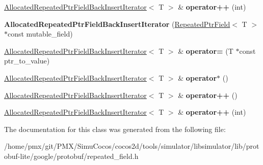 \begin{DoxyCompactItemize}
\hyperlink{classgoogle_1_1protobuf_1_1internal_1_1AllocatedRepeatedPtrFieldBackInsertIterator}{Allocated\+Repeated\+Ptr\+Field\+Back\+Insert\+Iterator}$<$ T $>$ \& {\bfseries operator++} (int)
\item 
\mbox{\label{classgoogle_1_1protobuf_1_1internal_1_1AllocatedRepeatedPtrFieldBackInsertIterator_a11470673c0ea0c8e9bcb431b05386671}} 
{\bfseries Allocated\+Repeated\+Ptr\+Field\+Back\+Insert\+Iterator} (\hyperlink{classgoogle_1_1protobuf_1_1RepeatedPtrField}{Repeated\+Ptr\+Field}$<$ T $>$ $\ast$const mutable\+\_\+field)
\item 
\mbox{\label{classgoogle_1_1protobuf_1_1internal_1_1AllocatedRepeatedPtrFieldBackInsertIterator_aaeecb23e156547bb981c0daeeac7f125}} 
\hyperlink{classgoogle_1_1protobuf_1_1internal_1_1AllocatedRepeatedPtrFieldBackInsertIterator}{Allocated\+Repeated\+Ptr\+Field\+Back\+Insert\+Iterator}$<$ T $>$ \& {\bfseries operator=} (T $\ast$const ptr\+\_\+to\+\_\+value)
\item 
\mbox{\label{classgoogle_1_1protobuf_1_1internal_1_1AllocatedRepeatedPtrFieldBackInsertIterator_a685a47e7dafd539725655a905087bed3}} 
\hyperlink{classgoogle_1_1protobuf_1_1internal_1_1AllocatedRepeatedPtrFieldBackInsertIterator}{Allocated\+Repeated\+Ptr\+Field\+Back\+Insert\+Iterator}$<$ T $>$ \& {\bfseries operator$\ast$} ()
\item 
\mbox{\label{classgoogle_1_1protobuf_1_1internal_1_1AllocatedRepeatedPtrFieldBackInsertIterator_aaf96b177bd6ed3b4f10818e1158e1906}} 
\hyperlink{classgoogle_1_1protobuf_1_1internal_1_1AllocatedRepeatedPtrFieldBackInsertIterator}{Allocated\+Repeated\+Ptr\+Field\+Back\+Insert\+Iterator}$<$ T $>$ \& {\bfseries operator++} ()
\item 
\mbox{\label{classgoogle_1_1protobuf_1_1internal_1_1AllocatedRepeatedPtrFieldBackInsertIterator_a6c513962487ea83e46bb1ca397b7359f}} 
\hyperlink{classgoogle_1_1protobuf_1_1internal_1_1AllocatedRepeatedPtrFieldBackInsertIterator}{Allocated\+Repeated\+Ptr\+Field\+Back\+Insert\+Iterator}$<$ T $>$ \& {\bfseries operator++} (int)
\end{DoxyCompactItemize}


The documentation for this class was generated from the following file\+:\begin{DoxyCompactItemize}
\item 
/home/pmx/git/\+P\+M\+X/\+Simu\+Cocos/cocos2d/tools/simulator/libsimulator/lib/protobuf-\/lite/google/protobuf/repeated\+\_\+field.\+h\end{DoxyCompactItemize}

